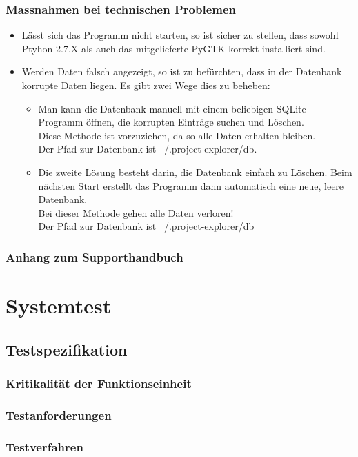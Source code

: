 \documentclass[10pt,paper=a4,final]{scrartcl}
\begin{document}
\subsubsection{Massnahmen bei technischen Problemen}
\begin{itemize}
\item L\"asst sich das Programm nicht starten, so ist sicher zu stellen, dass sowohl Ptyhon 2.7.X als auch das mitgelieferte PyGTK korrekt installiert sind.
\item Werden Daten falsch angezeigt, so ist zu bef\"urchten, dass in der Datenbank korrupte Daten liegen. Es gibt zwei Wege dies zu beheben:
\begin{itemize}
\item Man kann die Datenbank manuell mit einem beliebigen SQLite Programm \"offnen, die korrupten Eintr\"age suchen und L\"oschen.\\ Diese Methode ist vorzuziehen, da so alle Daten erhalten bleiben.\\ Der Pfad zur Datenbank ist ~/.project-explorer/db.
\item Die zweite L\"osung besteht darin, die Datenbank einfach zu L\"oschen. Beim n\"achsten Start erstellt das Programm dann automatisch eine neue, leere Datenbank.\\ Bei dieser Methode gehen alle Daten verloren!\\ Der Pfad zur Datenbank ist ~/.project-explorer/db
\end{itemize}
\end{itemize}
\subsubsection{Anhang zum Supporthandbuch}
\section{Systemtest}
\subsection{Testspezifikation}
\subsubsection{Kritikalit\"at der Funktionseinheit}
\subsubsection{Testanforderungen}
\subsubsection{Testverfahren}
\end{document}
